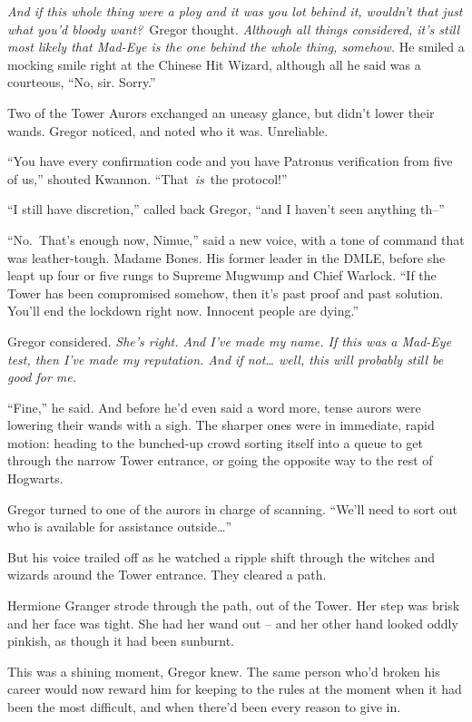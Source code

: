 \emph{And if this whole thing were a ploy and it was you lot behind it,
wouldn't that just what you'd bloody want?}~Gregor thought.
\emph{Although all things considered, it's still most likely that
Mad-Eye is the one behind the whole thing, somehow.} He smiled a mocking
smile right at the Chinese Hit Wizard, although all he said was a
courteous, ``No, sir. Sorry.''

Two of the Tower Aurors exchanged an uneasy glance, but didn't lower
their wands. Gregor noticed, and noted who it was. Unreliable.

``You have every confirmation code and you have Patronus verification
from five of us,'' shouted Kwannon. ``That~\emph{is}~the protocol!''

``I still have discretion,'' called back Gregor, ``and I haven't seen
anything th--''

``No.~That's enough now, Nimue,'' said a new voice, with a tone of
command that was leather-tough. Madame Bones. His former leader in the
DMLE, before she leapt up four or five rungs to Supreme Mugwump and
Chief Warlock. ``If the Tower has been compromised somehow, then it's
past proof and past solution. You'll end the lockdown right now.
Innocent people are dying.''

Gregor considered. \emph{She's right. And I've made my name. If this was
a Mad-Eye test, then I've made my reputation. And if not\ldots{} well,
this will probably still be good for me.}

``Fine,'' he said. And before he'd even said a word more, tense aurors
were lowering their wands with a sigh. The sharper ones were in
immediate, rapid motion: heading to the bunched-up crowd sorting itself
into a queue to get through the narrow Tower entrance, or going the
opposite way to the rest of Hogwarts.

Gregor turned to one of the aurors in charge of scanning. ``We'll need
to sort out who is available for assistance outside\ldots{}''

But his voice trailed off as he watched a ripple shift through the
witches and wizards around the Tower entrance. They cleared a path.

Hermione Granger strode through the path, out of the Tower. Her step was
brisk and her face was tight. She had her wand out -- and her other hand
looked oddly pinkish, as though it had been sunburnt.

This was a shining moment, Gregor knew. The same person who'd broken his
career would now reward him for keeping to the rules at the moment when
it had been the most difficult, and when there'd been every reason to
give in.

